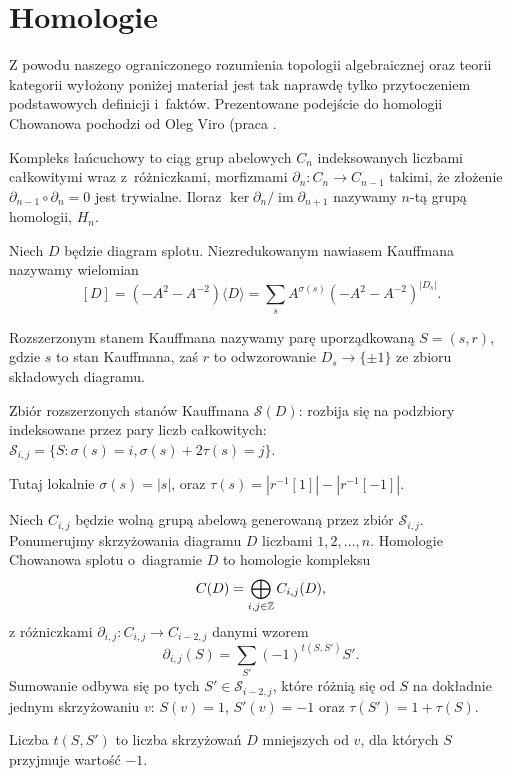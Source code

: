 \section{Homologie} %
\label{sec:homology}
Z powodu naszego ograniczonego rozumienia topologii algebraicznej oraz teorii kategorii
wyłożony poniżej materiał jest tak naprawdę tylko przytoczeniem podstawowych definicji i~faktów.
Prezentowane podejście do homologii Chowanowa pochodzi od Oleg Viro (praca \cite{viro04}.

Kompleks łańcuchowy to ciąg grup abelowych $C_n$ indeksowanych liczbami całkowitymi
wraz z~różniczkami, morfizmami $\partial_n \colon C_n \to C_{n-1}$ takimi,
że złożenie $\partial_{n-1} \circ \partial_n = 0$ jest trywialne.
Iloraz $\ker \partial_n / \operatorname{im} \partial_{n+1}$ nazywamy $n$-tą grupą homologii, $H_n$.


\begin{definition}
	Niech $D$ będzie diagram splotu.
	Niezredukowanym nawiasem Kauffmana nazywamy wielomian
	\[
		[D] = (-A^2 - A^{-2}) \langle D \rangle = \sum_s A^{\sigma(s)} (-A^2 - A^{-2})^{|D_s|}.
	\]
\end{definition}

\begin{definition}
	Rozszerzonym stanem Kauffmana nazywamy parę uporządkowaną $S = (s, r)$,
	gdzie $s$ to stan Kauffmana,
	zaś $r$ to odwzorowanie $D_s \to \{\pm 1\}$ ze zbioru składowych diagramu.
\end{definition}

\begin{definition}
	Zbiór rozszerzonych stanów Kauffmana $\mathcal S(D)$:
	rozbija się na podzbiory indeksowane przez pary liczb całkowitych:
	$\mathcal S_{i, j} = \{S : \sigma(s) = i, \sigma(s) + 2 \tau(s) = j\}$.
\end{definition}

Tutaj lokalnie $\sigma(s) = |s|$, oraz $\tau(s) = |r^{-1}[1]| - |r^{-1}[-1]|$.


\begin{definition}
	Niech $C_{i, j}$ będzie wolną grupą abelową generowaną przez zbiór $\mathcal S_{i, j}$.
	Ponumerujmy skrzyżowania diagramu $D$ liczbami $1, 2, \ldots, n$.
	Homologie Chowanowa splotu o~diagramie $D$ to homologie kompleksu
	\[
		C(D) = \bigoplus_{i, j \in \mathbb Z} C_{i, j}(D),
	\]
	z różniczkami $\partial_{i, j} \colon C_{i,j} \to C_{i-2, j}$ danymi wzorem
	\[
		\partial_{i, j}(S) = \sum_{S'} (-1)^{t(S, S')}  S'.
	\]
	Sumowanie odbywa się po tych $S' \in \mathcal S_{i-2, j}$,
	które różnią się od $S$ na dokładnie jednym skrzyżowaniu $v$:
	$S(v) = 1$, $S'(v) = -1$ oraz $\tau(S') = 1 + \tau (S)$.

	Liczba $t(S, S')$ to liczba skrzyżowań $D$ mniejszych od $v$, dla których $S$ przyjmuje wartość $-1$.
\end{definition}

